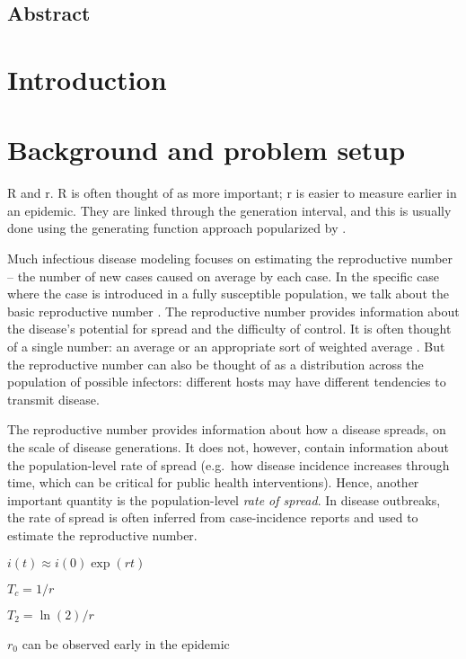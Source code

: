 \subsection{Abstract}\label{abstract}

\section{Introduction}\label{introduction}

\section{Background and problem
setup}\label{background-and-problem-setup}

R and r. R is often thought of as more important; r is easier to measure
earlier in an epidemic. They are linked through the generation interval,
and this is usually done using the generating function approach
popularized by \autocite{WallLips07}.

Much infectious disease modeling focuses on estimating the reproductive
number -- the number of new cases caused on average by each case. In the
specific case where the case is introduced in a fully susceptible
population, we talk about the basic reproductive number \Ro. The
reproductive number provides information about the disease's potential
for spread and the difficulty of control. It is often thought of a
single number: an average \autocite{AndeMay91} or an appropriate sort of
weighted average \autocite{DiekHees90}. But the reproductive number can
also be thought of as a distribution across the population of possible
infectors: different hosts may have different tendencies to transmit
disease.

The reproductive number provides information about how a disease
spreads, on the scale of disease generations. It does not, however,
contain information about the population-level rate of spread (e.g.~how
disease incidence increases through time, which can be critical for
public health interventions). Hence, another important quantity is the
population-level \emph{rate of spread}. In disease outbreaks, the rate
of spread is often inferred from case-incidence reports and used to
estimate the reproductive number.

\(i(t) \approx i(0) \exp(rt)\)

\(T_c = 1/r\)

\(T_2 = \ln(2)/r\)

\(r_0\) can be observed early in the epidemic

